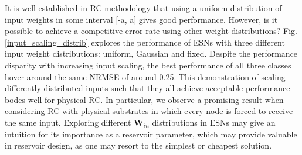 It is well-established in RC methodology that using a uniform distribution of
input weights in some interval [-a, a] gives good performance. However, is it
possible to achieve a competitive error rate using other weight distributions?
Fig. \ref{input_scaling_distrib} explores the performance of ESNs with three
different input weight distributions: uniform, Gaussian and fixed. Despite the
performance disparity with increasing input scaling, the best performance of all
three classes hover around the same NRMSE of around 0.25. This demonstration of
scaling differently distributed inputs such that they all achieve acceptable
performance bodes well for physical RC. In particular, we observe a promising
result when considering RC with physical substrates in which every node is
forced to receive the same input. Exploring different $\mathbf{W}_{in}$
distributions in ESNs may give an intuition for its importance as a reservoir
parameter, which may provide valuable in reservoir design, as one may resort to
the simplest or cheapest solution.

